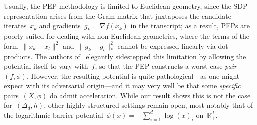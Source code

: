 \documentclass[11pt]{article}
\numberwithin{equation}{section}
\theoremstyle{remark}
\newcommand{\odima}[1]{{\color{magenta}#1}}
\newcommand{\R}{\mathbb{R}}
\newcommand{\Simp}{\Delta_d}
\newcommand{\1}{\mathbf{1}}
\begin{document}
Usually, the PEP methodology is limited to Euclidean geometry, since the SDP representation arises from the Gram matrix that juxtaposes the candidate iterates~$x_{k}$ and gradients~$g_{k} = \nabla f(x_{k})$ in the transcript; as a result, PEPs are poorly suited for dealing with non-Euclidean geometries, where the terms of the form~$\| x_k - x_l \|^2$ and~$\|g_k - g_l\|_*^2$ cannot be expressed linearly via dot products. 
The authors of~\cite{DragomirTaylordAspremontBolte2022} elegantly sidestepped this limitation by allowing the potential itself to vary with~$f$, so that the PEP constructs a worst-case {\em pair}~$(f,\phi)$. 
%
However, the resulting potential is quite pathological---as one might expect with its adversarial origin---and it may very well be that some {\em specific} pairs~$(X,\phi)$ do admit acceleration. 
While our result shows this is not the case for~$(\Simp, h)$, other highly structured settings remain open, most notably that of the logarithmic-barrier potential~$\phi(x) = -\sum_{i = 1}^d \log(x)_i$ on~$\R^d_+$. 



\end{document}
